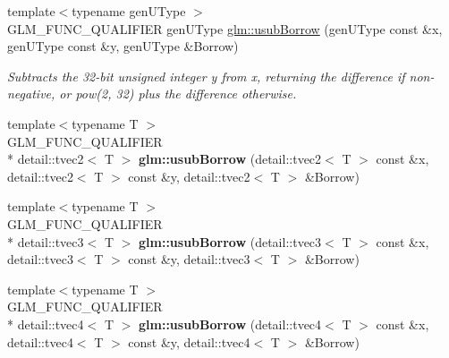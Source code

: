 \begin{DoxyCompactItemize}
\item 
{\footnotesize template$<$typename gen\-U\-Type $>$ }\\G\-L\-M\-\_\-\-F\-U\-N\-C\-\_\-\-Q\-U\-A\-L\-I\-F\-I\-E\-R gen\-U\-Type \hyperlink{group__core__func__integer_gacd727c8bb8bda7a509773f9f204ab5a1}{glm\-::usub\-Borrow} (gen\-U\-Type const \&x, gen\-U\-Type const \&y, gen\-U\-Type \&Borrow)
\begin{DoxyCompactList}\small\item\em Subtracts the 32-\/bit unsigned integer y from x, returning the difference if non-\/negative, or pow(2, 32) plus the difference otherwise. \end{DoxyCompactList}\item 
\hypertarget{namespaceglm_a532498a426298055126dff6955e00e06}{{\footnotesize template$<$typename T $>$ }\\G\-L\-M\-\_\-\-F\-U\-N\-C\-\_\-\-Q\-U\-A\-L\-I\-F\-I\-E\-R \\*
detail\-::tvec2$<$ T $>$ {\bfseries glm\-::usub\-Borrow} (detail\-::tvec2$<$ T $>$ const \&x, detail\-::tvec2$<$ T $>$ const \&y, detail\-::tvec2$<$ T $>$ \&Borrow)}\label{namespaceglm_a532498a426298055126dff6955e00e06}

\item 
\hypertarget{namespaceglm_a610ad53d0c72bd94246246036a3d5b0a}{{\footnotesize template$<$typename T $>$ }\\G\-L\-M\-\_\-\-F\-U\-N\-C\-\_\-\-Q\-U\-A\-L\-I\-F\-I\-E\-R \\*
detail\-::tvec3$<$ T $>$ {\bfseries glm\-::usub\-Borrow} (detail\-::tvec3$<$ T $>$ const \&x, detail\-::tvec3$<$ T $>$ const \&y, detail\-::tvec3$<$ T $>$ \&Borrow)}\label{namespaceglm_a610ad53d0c72bd94246246036a3d5b0a}

\item 
\hypertarget{namespaceglm_aafb35ca5600ad9f1e550d9c801929c52}{{\footnotesize template$<$typename T $>$ }\\G\-L\-M\-\_\-\-F\-U\-N\-C\-\_\-\-Q\-U\-A\-L\-I\-F\-I\-E\-R \\*
detail\-::tvec4$<$ T $>$ {\bfseries glm\-::usub\-Borrow} (detail\-::tvec4$<$ T $>$ const \&x, detail\-::tvec4$<$ T $>$ const \&y, detail\-::tvec4$<$ T $>$ \&Borrow)}\label{namespaceglm_aafb35ca5600ad9f1e550d9c801929c52}


\end{DoxyCompactItemize}
